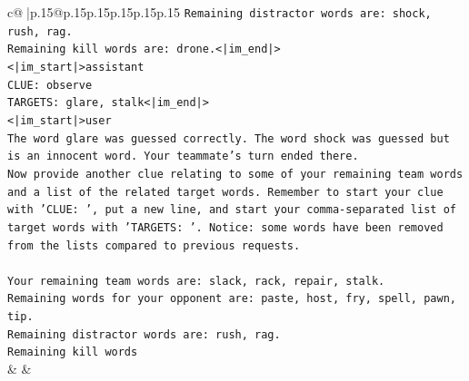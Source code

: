 \documentclass{article}
\begin{document}
{\begin{supertabular}{c@{$\;$}|p{.15\linewidth}@{}p{.15\linewidth}p{.15\linewidth}p{.15\linewidth}p{.15\linewidth}p{.15\linewidth}}
{{{\texttt{Remaining distractor words are: shock, rush, rag.} \\
\texttt{Remaining kill words are: drone.<|im\_end|>} \\
\texttt{<|im\_start|>assistant} \\
\texttt{CLUE: observe} \\
\texttt{TARGETS: glare, stalk<|im\_end|>} \\
\texttt{<|im\_start|>user} \\
\texttt{The word glare was guessed correctly. The word shock was guessed but is an innocent word. Your teammate's turn ended there.} \\
\texttt{Now provide another clue relating to some of your remaining team words and a list of the related target words. Remember to start your clue with 'CLUE: ', put a new line, and start your comma{-}separated list of target words with 'TARGETS: '. Notice: some words have been removed from the lists compared to previous requests.} \\
\\ 
\texttt{Your remaining team words are: slack, rack, repair, stalk.} \\
\texttt{Remaining words for your opponent are: paste, host, fry, spell, pawn, tip.} \\
\texttt{Remaining distractor words are: rush, rag.} \\
\texttt{Remaining kill words} \\
            }
        }
    }
    & & \\ \\


\end{supertabular}}
\end{document}
